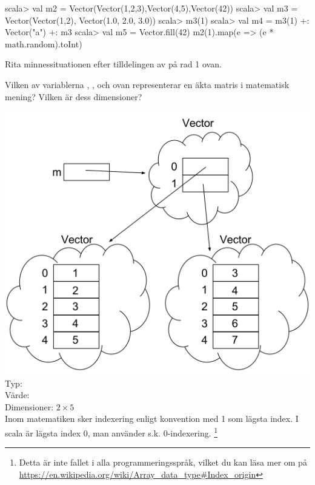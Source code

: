 \begin{REPL}
scala> val m2 = Vector(Vector(1,2,3),Vector(4,5),Vector(42))
scala> val m3 = Vector(Vector(1,2), Vector(1.0, 2.0, 3.0))
scala> m3(1)
scala> val m4 = m3(1) +: Vector("a") +: m3
scala> val m5 = Vector.fill(42){ m2(1).map(e => (e * math.random).toInt) }
\end{REPL}

\Subtask\Pen Rita minnessituationen efter tilldelingen av  på rad 1 ovan.

\Subtask\Pen Vilken av variablerna , ,  och  ovan representerar en äkta matris i matematisk mening? Vilken är dess dimensioner?



\SOLUTION


\TaskSolved \what


\SubtaskSolved   \includegraphics{../img/w09-solutions/1a} \\
Typ: \\
Värde:  \\
Dimensioner: $2 \times 5$\\
Inom matematiken sker indexering enligt konvention med 1 som lägsta index. I scala är lägsta index 0, man använder s.k. 0-indexering. \footnote{Detta är inte fallet i alla programmeringsspråk, vilket du kan läsa mer om på \url{https://en.wikipedia.org/wiki/Array\_data\_type\#Index\_origin}}

